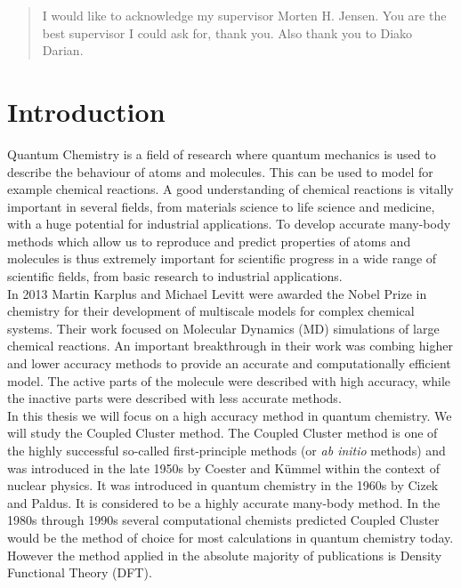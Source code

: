 \documentclass[a4paper,norsk,11pt,twoside]{report}
\begin{document}
\renewcommand{\abstractname}{Acknowledgements}
\begin{abstract}
I would like to acknowledge my supervisor Morten H. Jensen. You are the best supervisor I could ask for, thank you. Also thank you to Diako Darian. 
\end{abstract}


\tableofcontents{}

\maketitle
\newpage




\chapter{Introduction}

Quantum Chemistry is a field of research where quantum mechanics is
used to describe the behaviour of atoms and molecules. This can be
used to model for example chemical reactions. A good understanding of
chemical reactions is vitally important in several fields, from
materials science to life science and medicine, with a huge potential
for industrial applications. To develop accurate many-body methods
which allow us to reproduce and predict properties of atoms and
molecules is thus extremely important for scientific progress in a
wide range of scientific fields, from basic research to industrial
applications.\\

In 2013 Martin Karplus and Michael Levitt were awarded the Nobel Prize
in chemistry for their development of multiscale models for complex
chemical systems. Their work focused on Molecular Dynamics (MD)
simulations of large chemical reactions. An important breakthrough in
their work was combing higher and lower accuracy methods to provide an
accurate and computationally efficient model. The active parts of the
molecule were described with high accuracy, while the inactive parts
were described with less accurate methods. \\

In this thesis we will focus on a high accuracy method in quantum
chemistry. We will study the Coupled Cluster method. The Coupled Cluster method is one of the highly successful so-called first-principle methods (or {\em ab initio} methods) and  
was introduced in the late 1950s by Coester and K\"ummel within the context of nuclear physics. 
It was introduced in quantum chemistry in the 1960s by Cizek and Paldus. 
It is considered
to be a highly accurate many-body method. In the 1980s through 1990s several
computational chemists predicted Coupled Cluster would be the method
of choice for most calculations in quantum chemistry today. However
the method applied in the absolute majority of publications is 
Density Functional Theory (DFT).  \\
\end{document}
